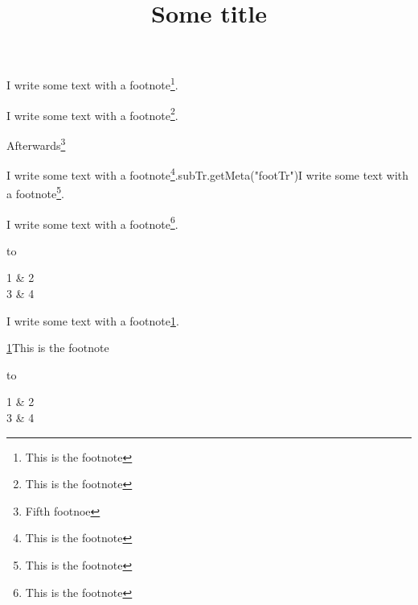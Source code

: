 \documentclass{article}
\begin{document}
\title{Some title}

\maketitle


I write some text with a footnote\footnote{This is the footnote}.


I write some text with a footnote\footnote{This is the footnote}.












Afterwards\footnote{Fifth footnoe}










I write some text with a footnote\footnote{This is the footnote}.subTr.getMeta("footTr")I write some text with a footnote\footnote{This is the footnote}.


I write some text with a footnote\footnote{This is the footnote}.






\begin{table}
\caption*{1}\label{T42478541}

\begin{tabu} to \textwidth { |X|X| }
\hline



1 & 2
 \\


3 & 4
 \\
\hline

\end{tabu}\end{table}







I write some text with a footnote\hyperlink{sdfootnote1sym}{1}.


\hyperlink{sdfootnote1anc}{1}This is the footnote

\begin{table}
\caption*{1}\label{T62344111}

\begin{tabu} to \textwidth { |X|X| }
\hline



1 & 2
 \\


3 & 4
 \\
\hline

\end{tabu}\end{table}
\end{document}
